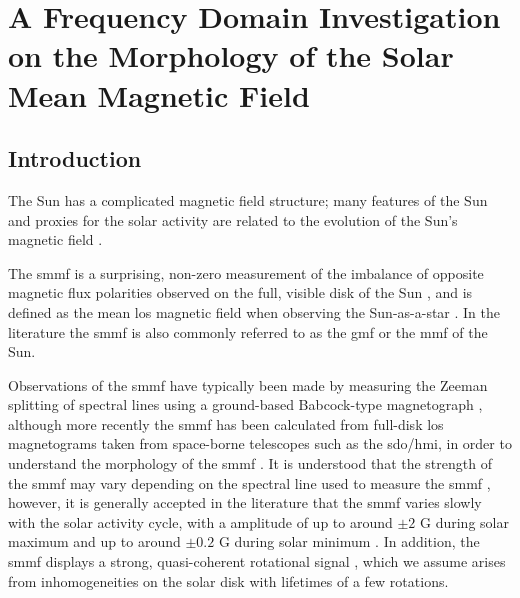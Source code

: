 \chapter{A Frequency Domain Investigation on the Morphology of the Solar Mean Magnetic Field}\label{chap:SMMF}

\section{Introduction}\label{sec:SMMF_intro}

The Sun has a complicated magnetic field structure; many features of the Sun and proxies for the solar activity are related to the evolution of the Sun's magnetic field \citep{wu_solar_2018}.

The \gls{smmf} is a surprising, non-zero measurement of the imbalance of opposite magnetic flux polarities observed on the full, visible disk of the Sun \citep{svalgaard_suns_1975}, and is defined as the mean \gls{los} magnetic field when observing the Sun-as-a-star \citep{scherrer_mean_1977, scherrer_mean_1977-1, garcia_integrated_1999}. In the literature the \gls{smmf} is also commonly referred to as the \gls{gmf} \citep{severny_time_1971} or the \gls{mmf} \citep{kotov_mean_2008} of the Sun.

Observations of the \gls{smmf} have typically been made by measuring the Zeeman splitting of spectral lines using a ground-based Babcock-type magnetograph \citep{scherrer_mean_1977}, although more recently the \gls{smmf} has been calculated from full-disk \gls{los} magnetograms taken from space-borne telescopes such as the \gls{sdo/hmi}, in order to understand the morphology of the \gls{smmf} \citep{kutsenko_contribution_2017, bose_variability_2018}. It is understood that the strength of the \gls{smmf} may vary depending on the spectral line used to measure the \gls{smmf} \citep{kotov_mean_2008, kotov_enigmas_2012}, however, it is generally accepted in the literature that the \gls{smmf} varies slowly with the solar activity cycle, with a amplitude of up to around $\pm 2$ G during solar maximum and up to around $\pm 0.2$ G during solar minimum \citep{plachinda_general_2011}. In addition, the \gls{smmf} displays a strong, quasi-coherent rotational signal \citep{chaplin_studies_2003, xie_temporal_2017}, which we assume arises from inhomogeneities on the solar disk with lifetimes of a few rotations.

